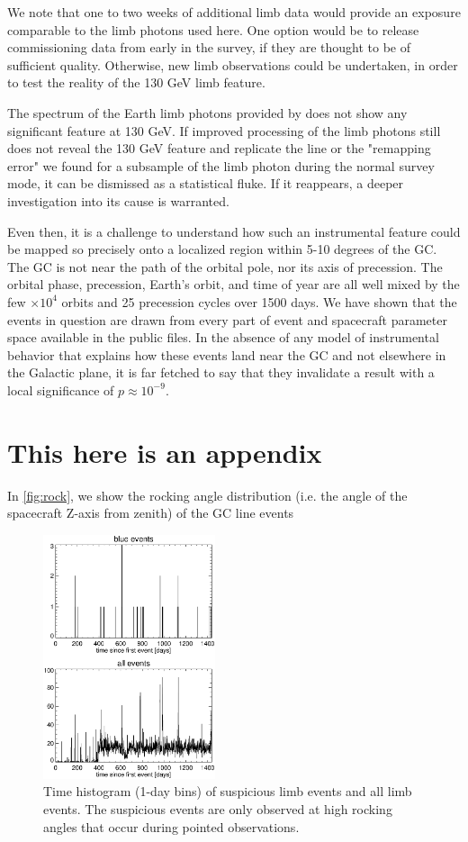 \documentclass[aps,twocolumn,prd,superscriptaddress,showpacs,nofootinbib,fixfloat]{revtex4}
\begin{document}
We note that one to two weeks of additional limb data would
provide an exposure comparable to the limb photons used
here.  One option would be to release commissioning data
from early in the survey, if they are thought to be of
sufficient quality.  Otherwise, new limb observations could
be undertaken, in order to test the reality of the 130 GeV
limb feature.

The spectrum of the Earth limb photons provided by
\citep{FermiLimb} does not show any significant feature at
130 GeV. If improved processing of the limb photons still
does not reveal the 130 GeV feature and replicate the line
or the "remapping error" we found for a subsample of the
limb photon during the normal survey mode, it can be
dismissed as a statistical fluke.  If it reappears, a deeper
investigation into its cause is warranted.

Even then, it is a challenge to understand how such an
instrumental feature could be mapped so precisely onto a
localized region within 5-10 degrees of the GC.  The GC is
not near the path of the orbital pole, nor its axis of
precession.  The orbital phase, precession, Earth's orbit,
and time of year are all well mixed by the few $\times10^4$
orbits and 25 precession cycles over 1500 days.  We have
shown that the events in question are drawn from every part
of event and spacecraft parameter space available in the
public files.  In the absence of any model of instrumental
behavior that explains how these events land near the GC and
not elsewhere in the Galactic plane, it is far fetched to
say that they invalidate a result with a local significance
of $p\approx10^{-9}$.


\appendix
\section{This here is an appendix}

In \ref{fig:rock}, we show the rocking angle distribution
(i.e. the angle of the spacecraft Z-axis from zenith) of the
GC line events


\begin{figure}
\centering
\includegraphics[width=0.45\textwidth]{plots/timehist.ps}
\caption{Time histogram (1-day bins) of suspicious limb events and all limb
events.  The suspicious events are only observed at high rocking
angles that occur during pointed observations.
}
\label{fig:timehist}
\end{figure}
\end{document}
